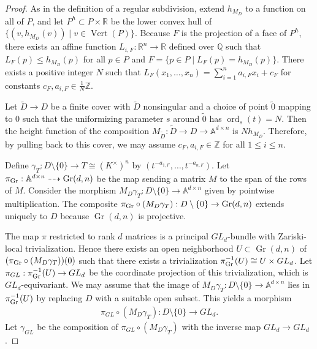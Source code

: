 \documentclass[12pt]{amsart}
\newcommand{\mb}{\mathbb}
\newcommand{\wt}{\widetilde}
\newcommand{\Vt}{{\operatorname{Vert}}}
\newcommand{\Gr}{{\operatorname{Gr}}}
\theoremstyle{plain}
\theoremstyle{definition}
\theoremstyle{remark}
\begin{document}
\begin{proof}
As in the definition of a regular subdivision, extend $h_{M_D}$ to a function on all of $P$, and let $P^h \subset P\times \mb{R}$ be the lower convex hull of $\{(v,h_{M_D}(v))\mid v\in \Vt(P)\}$. Because $F$ is the projection of a face of $P^h$, there exists an affine function $L_{i,F}:\mb{R}^n\to \mb{R}$ defined over $\mathbb{Q}$ such that $L_F(p) \le h_{M_D}(p)$ for all $p \in P$ and $F = \{p \in P \mid L_{F}(p)=h_{M_D}(p)\}$. There exists a positive integer $N$ such that $L_F(x_1,\ldots,x_n)=\sum_{i=1}^n a_{i,F}x_i+c_F$ for constants $c_F,a_{i,F}\in \frac{1}{N}\mb{Z}$.

Let $\wt{D}\to D$ be a finite cover with $\wt{D}$ nonsingular and a choice of point $\wt{0}$ mapping to $0$ such that the uniformizing parameter $s$ around $\wt{0}$ has $\operatorname{ord}_{s}(t)=N$. Then the height function of the composition $M_{\wt{D}}: \tilde{D}\to D\to \mb{A}^{d\times n}$ is $Nh_{M_D}$. Therefore, by pulling back to this cover, we may assume $c_F,a_{i,F}\in \mb{Z}$ for all $1 \le i \le n$. 

Define $\gamma_T: D \setminus \{0\} \to T\cong  (K^{\times})^n$ by $(t^{-a_{1,F}},\ldots,t^{-a_{n,F}})$.  Let $\pi_{{\rm Gr}}: \mb{A}^{d\times n}\dashrightarrow \Gr(d,n)$ be the map sending a matrix $M$ to the span of the rows of $M$. Consider the morphism $M_D \gamma_T : D\setminus\{0\} \to \mb{A}^{d\times n}$ given by pointwise multiplication. The composite $\pi_{{\rm Gr}}\circ (M_D\gamma_T): D\setminus\{0\}\to \Gr(d,n)$ extends uniquely to $D$ because $\Gr(d,n)$ is projective.

The map $\pi$ restricted to rank $d$ matrices is a principal $GL_d$-bundle with Zariski-local trivialization. Hence there exists an open neighborhood $U\subset \Gr(d,n)$ of $(\pi_{{\rm Gr}}\circ (M_D\gamma_T))(0)$ such that there exists a trivialization $\pi_{{\rm Gr}}^{-1}(U)\cong U\times GL_d$. Let $\pi_{GL} : \pi_{{\rm Gr}}^{-1}(U) \to GL_d$ be the coordinate projection of this trivialization, which is $GL_d$-equivariant. We may assume that the image of $M_D\gamma_T: D \setminus \{0\}\to \mb{A}^{d\times n}$ lies in $\pi_{{\rm Gr}}^{-1}(U)$ by replacing $D$ with a suitable open subset. This yields a morphism
\begin{align*}
\pi_{GL} \circ (M_D \gamma_T) : D \setminus \{0\}\to GL_d. \label{GLmap}
\end{align*}
Let $\gamma_{GL}$ be the composition of $\pi_{GL} \circ (M_D \gamma_T)$ with the inverse map $GL_d\to GL_d$. 


\end{proof}
\end{document}
